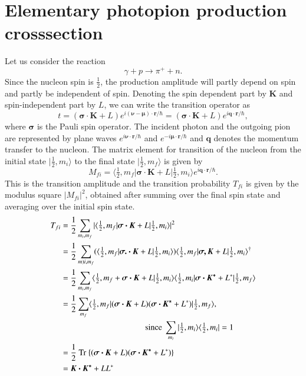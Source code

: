 \section[Elementary photopion production cross section]{Elementary photopion production cross\hfil\break section}\label{chap3-sec4}

Let us consider the reaction
$$
\gamma + p \to \pi^+ + n.
$$
Since the nucleon spin is $\frac{1}{2}$, the production amplitude will partly depend on spin and partly be independent of spin. Denoting the spin dependent part by ${\boldsymbol  K}$ and spin-independent part by $L$, we can write the transition operator as
\setcounter{equation}{30}
\begin{equation}
t= (\boldsymbol{ \sigma \cdot K} + L) e^{i\boldsymbol{(\nu- \mu)\cdot r}/\hbar}= (\boldsymbol{\sigma \cdot K} + L) e^{i \boldsymbol{q \cdot r}/\hbar}, \label{chap3-eq31}
\end{equation}
where $\boldsymbol{\sigma}$ is the Pauli spin operator. The incident photon and the outgoing pion are represented by plane waves $e^{i\boldsymbol{\nu  \cdot r}/\hbar}$ and $e^{-i \boldsymbol{\mu \cdot r} /\hbar}$ and ${\boldsymbol  q}$ denotes the momentum transfer to the nucleon. The matrix element for transition of the nucleon from the initial state $|\frac{1}{2}, m_i \rangle$ to the final state $|\frac{1}{2}, m_f \rangle$ is given by
\begin{equation}
  M_{fi} = \langle \tfrac{1}{2}, m_f | \boldsymbol{\sigma \cdot K} + L | \tfrac{1}{2}, m_i \rangle e^{i \boldsymbol{q \cdot r}/\hbar}. \label{chap3-eq32}
\end{equation}
This is the transition amplitude and the transition probability $T_{fi}$ is given by the modulus square $|M_{fi}|^2$, obtained after summing over the final spin state and averaging over the initial spin state.
\begin{align}
  T_{fi} & = \frac{1}{2} \sum_{m_i, m_f} | \langle \tfrac{1}{2}, m_f | \boldsymbol{\sigma \cdot K} + L | \tfrac{1}{2}, m_i\rangle|^2 \notag \\
  & = \frac{1}{2} \sum_{m)i, m_f} (\langle \tfrac{1}{2}, m_f | \boldsymbol{\sigma. \cdot K} + L| \tfrac{1}{2}, m_i \rangle) \langle \tfrac{1}{2}, m_f | \boldsymbol{\sigma, K} + L| \tfrac{1}{2}, m_i \rangle^\dagger \notag\\
  & = \frac{1}{2} \sum_{m_i, m_f} \langle \tfrac{1}{2}, m_f + \boldsymbol{\sigma \cdot K} + L | \tfrac{1}{2}, m_i \rangle \langle \tfrac{1}{2} , m_i | \boldsymbol{\sigma \cdot K^\ast}+ L^\ast| \tfrac{1}{2}, m_f \rangle \notag\\
  & = \frac{1}{2} \sum_{m_f} \langle \tfrac{1}{2}, m_f | (\boldsymbol{\sigma \cdot K} + L) (\boldsymbol{\sigma \cdot K^\ast} + L^\ast) | \tfrac{1}{2}, m_f \rangle,\notag\\
  & \qquad \qquad \qquad \qquad \qquad ~\text{since}~ \sum_{m_i} |\tfrac{1}{2}, m_i \rangle \langle \tfrac{1}{2}, m_i| =1 \notag\\
  & = \frac{1}{2} ~\text{Tr}~  \{ (\boldsymbol{\sigma \cdot K}+L)(\boldsymbol{\sigma \cdot K^\ast}
  + L^\ast)\}\notag \\
  & = \boldsymbol{K \cdot K^\ast} + LL^\ast \label{chap3-eq33}
\end{align}
